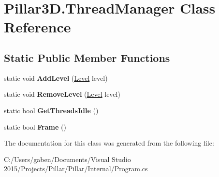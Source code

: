 \hypertarget{class_pillar3_d_1_1_thread_manager}{}\section{Pillar3\+D.\+Thread\+Manager Class Reference}
\label{class_pillar3_d_1_1_thread_manager}
\subsection*{Static Public Member Functions}
\begin{DoxyCompactItemize}
\item 
\mbox{\label{class_pillar3_d_1_1_thread_manager_a63db83e5522df03991d1a8185fd52af0}} 
static void {\bfseries Add\+Level} (\hyperlink{class_pillar3_d_1_1_level}{Level} level)
\item 
\mbox{\label{class_pillar3_d_1_1_thread_manager_a710bc7fb00c6ec5c02cce9e3ffd167fb}} 
static void {\bfseries Remove\+Level} (\hyperlink{class_pillar3_d_1_1_level}{Level} level)
\item 
\mbox{\label{class_pillar3_d_1_1_thread_manager_a9a202245f3cd86a1d4a114f5a26b7219}} 
static bool {\bfseries Get\+Threads\+Idle} ()
\item 
\mbox{\label{class_pillar3_d_1_1_thread_manager_a05e5b3644524692bcc2f6e9524260e1b}} 
static bool {\bfseries Frame} ()
\end{DoxyCompactItemize}


The documentation for this class was generated from the following file\+:\begin{DoxyCompactItemize}
\item 
C\+:/\+Users/gaben/\+Documents/\+Visual Studio 2015/\+Projects/\+Pillar/\+Pillar/\+Internal/Program.\+cs\end{DoxyCompactItemize}
